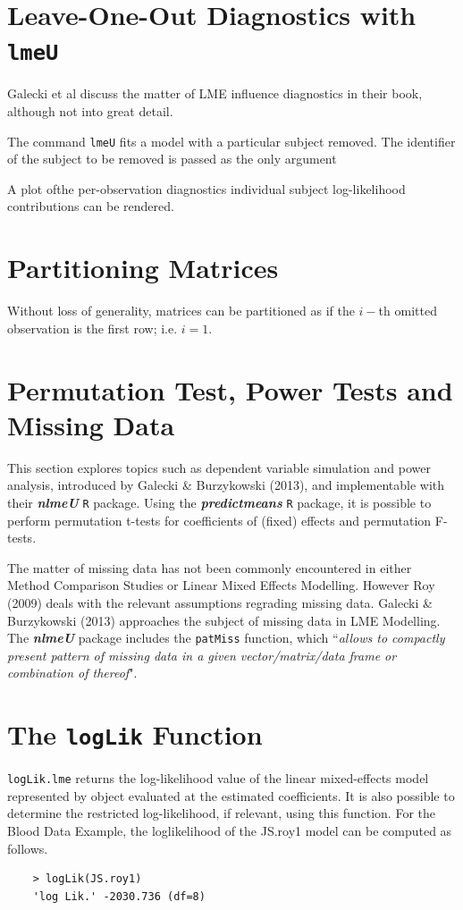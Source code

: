 \documentclass[12pt, a4paper]{report}
\theoremstyle{plain}
\theoremstyle{definition}
\theoremstyle{remark}
\begin{document}
\section*{Leave-One-Out Diagnostics with \texttt{lmeU}}
Galecki et al discuss the matter of LME influence diagnostics in their book, although not into great detail.


The command \texttt{lmeU} fits a model with a particular subject removed. The identifier of the subject to be removed is passed as the only argument

A plot ofthe per-observation diagnostics individual subject log-likelihood contributions can be rendered.


\section{Partitioning Matrices} %
Without loss of generality, matrices can be partitioned as if the $i-$th omitted observation is the first row; i.e. $i=1$.


\section*{Permutation Test, Power Tests and Missing Data }

This section explores topics such as dependent variable simulation and power analysis, introduced by Galecki \& Burzykowski (2013), and implementable with their \textbf{\textit{nlmeU}} \texttt{R} package.
Using the \textbf{\textit{predictmeans}} \texttt{R} package, it is possible to perform permutation t-tests for coefficients of (fixed) effects and permutation F-tests.

The matter of missing data has not been commonly encountered in either Method Comparison Studies or Linear Mixed Effects Modelling. However Roy (2009) deals with the relevant assumptions regrading missing data. Galecki \& Burzykowski (2013) approaches the subject of missing data in LME Modelling. The \textbf{\textit{nlmeU}} package includes the \texttt{patMiss} function, which ``\textit{allows to compactly present pattern of missing data in a given vector/matrix/data
	frame or combination of thereof}".




\section{The \texttt{logLik} Function}
\texttt{logLik.lme} returns the log-likelihood value of the linear mixed-effects model represented by object evaluated at the estimated coefficients. It is also possible to determine the restricted log-likelihood, if relevant, using this function. For the Blood Data Example,  the loglikelihood of the JS.roy1 model can be computed as follows.
\begin{framed}
	\begin{verbatim}
	> logLik(JS.roy1)
	'log Lik.' -2030.736 (df=8)
	\end{verbatim}
\end{framed}


\end{document}
